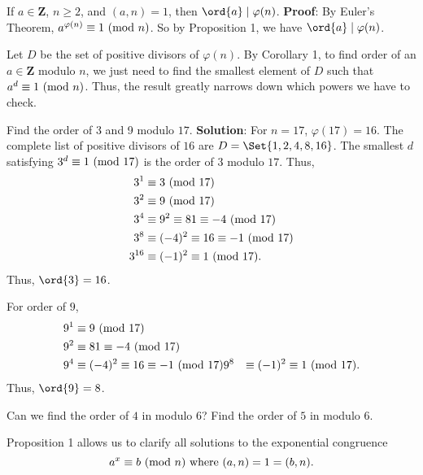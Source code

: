 \begin{Corollary}{}{}
    If $ a\in\mathbf{Z} $, $ n\ge 2 $, and $ (a,n)=1 $, then $ \ord{a}\mid \varphi(n) $.
    \tcblower{}
    \textbf{Proof}: By Euler's Theorem, $ a^{\varphi(n)}\equiv 1\ (\mathrm{mod}\ n) $. So by Proposition 1, we have
    $ \ord{a}\mid \varphi(n) $.
\end{Corollary}
Let $ D $ be the set of positive divisors of $ \varphi(n) $. By Corollary 1, to find order of
an $ a\in\mathbf{Z} $ modulo $ n $, we just need to find the smallest element of $ D $
such that $ a^d\equiv 1\ (\mathrm{mod}\ n) $. Thus, the result greatly narrows down which powers we have to check.
\begin{Example}{}{}
    Find the order of 3 and 9 modulo $ 17 $.
    \tcblower{}
    \textbf{Solution}: For $ n=17 $, $ \varphi(17)=16 $. The complete list of positive divisors of $ 16 $
    are $ D=\Set{1,2,4,8,16} $. The smallest $ d $ satisfying $ 3^d\equiv 1\ (\mathrm{mod}\ 17) $ is
    the order of $ 3 $ modulo $ 17 $. Thus,
    \begin{align*}
        3^1    & \equiv 3\ (\mathrm{mod}\ 17)                        \\
        3^2    & \equiv 9\ (\mathrm{mod}\ 17)                        \\
        3^4    & \equiv 9^2\equiv 81\equiv -4\ (\mathrm{mod}\ 17)    \\
        3^8    & \equiv (-4)^2\equiv 16\equiv -1\ (\mathrm{mod}\ 17) \\
        3^{16} & \equiv (-1)^2\equiv 1\ (\mathrm{mod}\ 17).
    \end{align*}
    Thus, $ \ord{3}=16 $.

    For order of $ 9 $,
    \begin{align*}
        9^1 & \equiv 9\ (\mathrm{mod}\ 17)                        \\
        9^2 & \equiv 81\equiv -4\ (\mathrm{mod}\ 17)              \\
        9^4 & \equiv (-4)^2\equiv 16\equiv -1\ (\mathrm{mod}\ 17)
        9^8 & \equiv (-1)^2\equiv 1\ (\mathrm{mod}\ 17).
    \end{align*}
    Thus, $ \ord{9}=8 $.
\end{Example}
\begin{Exercise}{}{}
    Can we find the order of $ 4 $ in modulo $ 6 $? Find the order of $ 5 $ in modulo $ 6 $.
\end{Exercise}
Proposition 1 allows us to clarify all solutions to the exponential congruence
\[ a^x\equiv b\ (\mathrm{mod}\ n)\text{ where }(a,n)=1=(b,n). \]
